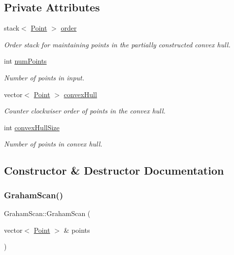 \subsection*{Private Attributes}
\begin{DoxyCompactItemize}
\item 
stack$<$ \mbox{\hyperlink{classPoint}{Point}} $>$ \mbox{\hyperlink{classGrahamScan_ab90660de0ce0be702da0760f37f7d797}{order}}
\begin{DoxyCompactList}\small\item\em Order stack for maintaining points in the partially constructed convex hull. \end{DoxyCompactList}\item 
int \mbox{\hyperlink{classGrahamScan_a6d28337ba41b02338253a3ebbec09463}{num\+Points}}
\begin{DoxyCompactList}\small\item\em Number of points in input. \end{DoxyCompactList}\item 
vector$<$ \mbox{\hyperlink{classPoint}{Point}} $>$ \mbox{\hyperlink{classGrahamScan_a9e8a22177ddeb913962a75e5b9f00dc9}{convex\+Hull}}
\begin{DoxyCompactList}\small\item\em Counter clockwiser order of points in the convex hull. \end{DoxyCompactList}\item 
int \mbox{\hyperlink{classGrahamScan_a201595ff26bee9c3084e8fce0e7643ad}{convex\+Hull\+Size}}
\begin{DoxyCompactList}\small\item\em Number of points in convex hull. \end{DoxyCompactList}\end{DoxyCompactItemize}


\subsection{Constructor \& Destructor Documentation}
\mbox{\label{classGrahamScan_aa774467ce21242d7ef7ffbd1680a6d61}} 
\subsubsection{\texorpdfstring{Graham\+Scan()}{GrahamScan()}}
{\footnotesize\ttfamily Graham\+Scan\+::\+Graham\+Scan (\begin{DoxyParamCaption}\item[{vector$<$ \mbox{\hyperlink{classPoint}{Point}} $>$ \&}]{points }\end{DoxyParamCaption})}



